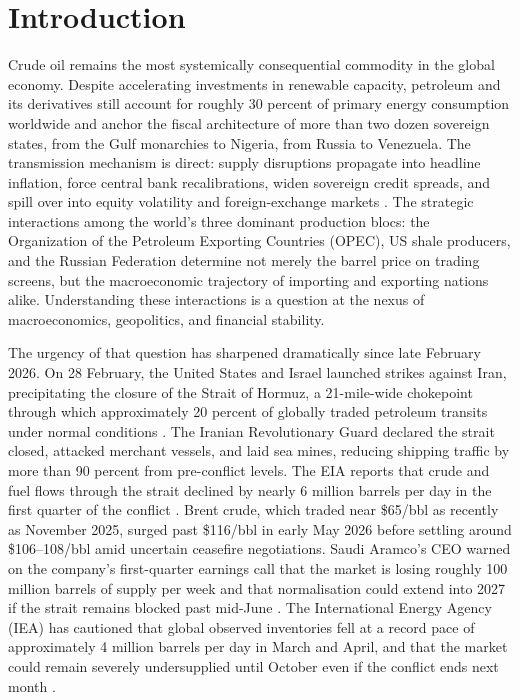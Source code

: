 \section{Introduction}
\label{sec:introduction}

Crude oil remains the most systemically consequential commodity in the
global economy. Despite accelerating investments in renewable capacity,
petroleum and its derivatives still account for roughly 30 percent of
primary energy consumption worldwide \citep{iea2025} and anchor the
fiscal architecture of more than two dozen sovereign states, from the
Gulf monarchies to Nigeria, from Russia to Venezuela. The transmission
mechanism is direct: supply disruptions propagate into headline
inflation, force central bank recalibrations, widen sovereign credit
spreads, and spill over into equity volatility and foreign-exchange
markets \citep{kilian2016,barskykilian2004}. The strategic interactions
among the world's three dominant production blocs: the Organization of
the Petroleum Exporting Countries (OPEC), US shale producers, and the
Russian Federation determine not merely the barrel price on trading
screens, but the macroeconomic trajectory of importing and exporting
nations alike. Understanding these interactions is a question at the
nexus of macroeconomics, geopolitics, and financial stability.

The urgency of that question has sharpened dramatically since late
February 2026. On 28 February, the United States and Israel launched
strikes against Iran, precipitating the closure of the Strait of Hormuz,
a 21-mile-wide chokepoint through which approximately 20 percent of
globally traded petroleum transits under normal conditions
\citep{crs2026}. The Iranian Revolutionary Guard declared the strait
closed, attacked merchant vessels, and laid sea mines, reducing shipping
traffic by more than 90 percent from pre-conflict levels. The EIA reports
that crude and fuel flows through the strait declined by nearly
6 million barrels per day in the first quarter of the conflict
\citep{eia2026}. Brent crude, which traded near \$65/bbl as recently as
November 2025, surged past \$116/bbl in early May 2026 before settling
around \$106--108/bbl amid uncertain ceasefire negotiations. Saudi
Aramco's CEO warned on the company's first-quarter earnings call that
the market is losing roughly 100 million barrels of supply per week and
that normalisation could extend into 2027 if the strait remains blocked
past mid-June \citep{cnbc2026}. The International Energy Agency (IEA)
has cautioned that global observed inventories fell at a record pace of
approximately 4 million barrels per day in March and April, and that the
market could remain severely undersupplied until October even if the
conflict ends next month \citep{iea2026omr}.

